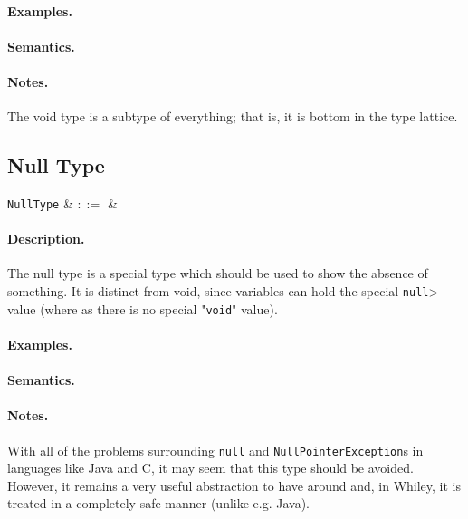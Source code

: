 \paragraph{Examples.}

\paragraph{Semantics.}

\paragraph{Notes.} The void type is a subtype of everything; that is, it is bottom in the type lattice.


\subsection{Null Type}

\begin{syntax}
  \verb+NullType+ & $::=$ &  \\
\end{syntax}

\paragraph{Description.}  The null type is a special type which should
be used to show the absence of something. It is distinct from void,
since variables can hold the special \lstinline{null}> value (where as
there is no special "\lstinline{void}" value).

\paragraph{Examples.}

\paragraph{Semantics.}

\paragraph{Notes.}  With all of the problems surrounding
\lstinline{null} and \lstinline{NullPointerException}s in languages
like Java and C, it may seem that this type should be
avoided. However, it remains a very useful abstraction to have around
and, in Whiley, it is treated in a completely safe manner (unlike
e.g. Java).

